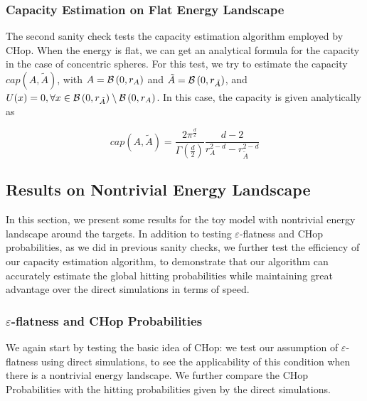 \documentclass[english, aip, jcp, priprint, graphicx]{revtex4-1}
\theoremstyle{plain}
\theoremstyle{definition}
\theoremstyle{plain}
\begin{document}


\subsubsection{Capacity Estimation on Flat Energy Landscape}

The second sanity check tests the capacity estimation algorithm employed by CHop. When the energy is flat, we can get an analytical formula for the capacity in the case of concentric spheres. For this test, we try to estimate the capacity $cap(A, \tilde{A})$, with $A=\mathcal{B}\left(0, r_A\right)$ and $\tilde{A}=\mathcal{B}\left(0, r_{\tilde{A}}\right)$, and $U(x)=0,\forall x \in \mathcal{B}\left(0, r_{\tilde{A}}\right) \setminus \mathcal{B}\left(0, r_A\right)$. In this case, the capacity is given analytically as

\begin{equation}
cap(A, \tilde{A}) = \frac{2\pi^{\frac{d}{2}}}{\Gamma(\frac{d}{2})}\frac{d - 2}{r_A^{2 - d} - r_{\tilde{A}}^{2 - d}}
\end{equation}



\subsection{Results on Nontrivial Energy Landscape}

In this section, we present some results for the toy model with nontrivial energy landscape around the targets. In addition to testing $\varepsilon$-flatness and CHop probabilities, as we did in previous sanity checks, we further test the efficiency of our capacity estimation algorithm, to demonstrate that our algorithm can accurately estimate the global hitting probabilities while maintaining great advantage over the direct simulations in terms of speed.



\subsubsection{$\varepsilon$-flatness and CHop Probabilities}

We again start by testing the basic idea of CHop: we test our assumption of $\varepsilon$-flatness using direct simulations, to see the applicability of this condition when there is a nontrivial energy landscape. We further compare the CHop Probabilities with the hitting probabilities given by the direct simulations.
\end{document}
